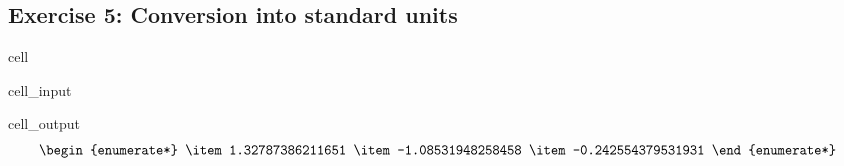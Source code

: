 \documentclass[letterpaper,10pt,english]{jupyterBook}
\begin{document}
\subsection{Exercise 5: Conversion into standard units}
\label{\detokenize{exercises_unit_3:exercise-5-conversion-into-standard-units}}
\begin{sphinxuseclass}{cell}\begin{sphinxVerbatimInput}

\begin{sphinxuseclass}{cell_input}
\begin{sphinxVerbatim}[commandchars=\\\{\}]


\end{sphinxVerbatim}

\end{sphinxuseclass}\end{sphinxVerbatimInput}
\begin{sphinxVerbatimOutput}

\begin{sphinxuseclass}{cell_output}\begin{equation*}
\begin{split}\begin{enumerate*}
\item 1.32787386211651
\item -1.08531948258458
\item -0.242554379531931
\end{enumerate*}\end{split}
\end{equation*}
\end{sphinxuseclass}\end{sphinxVerbatimOutput}

\end{sphinxuseclass}
\end{document}
